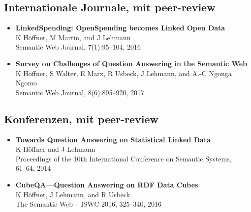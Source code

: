 \documentclass{article}
\begin{document}
\subsection*{Internationale Journale, mit peer-review}
\begin{itemize}
\item \textbf{LinkedSpending: OpenSpending becomes Linked Open Data}~\\
K Höffner, M  Martin, and J Lehmann\\
Semantic Web Journal, 7(1):95--104, 2016
\item \textbf{Survey on Challenges of Question Answering in the Semantic Web}~\\
K Höffner, S Walter, E Marx, R Usbeck, J Lehmann, and A.-C Ngonga Ngomo\\
Semantic Web Journal, 8(6):895--920, 2017
\end{itemize}

\subsection*{Konferenzen, mit peer-review}
\begin{itemize}
\item \textbf{Towards Question Answering on Statistical Linked Data}~\\
K Höffner and J Lehmann\\
Proceedings of the 10th International Conference on Semantic Systems,\\61--64, 2014
\item \textbf{CubeQA---Question Answering on RDF Data Cubes}~\\
K Höffner, J Lehmann, and R Usbeck\\
The Semantic Web -- ISWC 2016, 325--340, 2016
\end{itemize}

\end{document}
